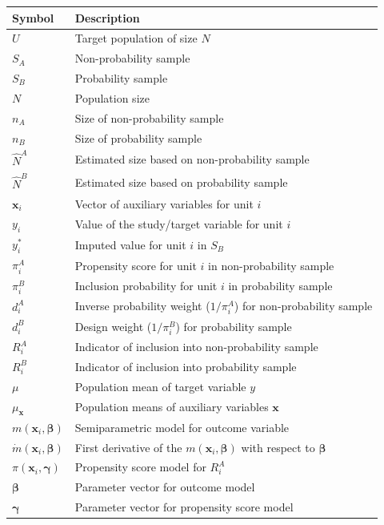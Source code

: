 \documentclass[
]{jss}
\begin{document}
\begin{table}[ht!]
\centering
\begin{tabular}{ll}
\hline
\textbf{Symbol} & \textbf{Description} \\
\hline
$U$ & Target population of size $N$ \\
$S_A$ & Non-probability sample \\
$S_B$ & Probability sample \\
$N$ & Population size \\
$n_A$ & Size of non-probability sample \\
$n_B$ & Size of probability sample \\
$\hat{N}^A$ & Estimated size based on non-probability sample \\
$\hat{N}^B$ & Estimated size based on probability sample \\
$\boldsymbol{x}_i$ & Vector of auxiliary variables for unit $i$ \\
$y_i$ & Value of the study/target variable for unit $i$ \\
$y_i^*$ & Imputed value for unit $i$ in $S_B$\\
$\pi_i^A$ & Propensity score for unit $i$ in non-probability sample \\
$\pi_i^B$ & Inclusion probability for unit $i$ in probability sample \\
$d_i^A$ & Inverse probability weight ($1/\pi_i^A$) for non-probability sample \\
$d_i^B$ & Design weight ($1/\pi_i^B$) for probability sample \\
$R_i^A$ & Indicator of inclusion into non-probability sample \\
$R_i^B$ & Indicator of inclusion into probability sample \\
$\mu$ & Population mean of target variable $y$ \\
$\mu_{\boldsymbol{x}}$ & Population means of auxiliary variables $\boldsymbol{x}$ \\
$m(\boldsymbol{x}_i, \boldsymbol{\beta})$ & Semiparametric model for outcome variable \\
$\dot{m}(\boldsymbol{x}_i, \boldsymbol{\beta})$ & First derivative of the $m(\boldsymbol{x}_i, \boldsymbol{\beta})$ with respect to $\boldsymbol{\beta}$ \\
$\pi(\boldsymbol{x}_i, \boldsymbol{\gamma})$ & Propensity score model for $R_i^A$ \\
$\boldsymbol{\beta}$ & Parameter vector for outcome model \\
$\boldsymbol{\gamma}$ & Parameter vector for propensity score model \\

\end{tabular}
\end{table}
\end{document}
